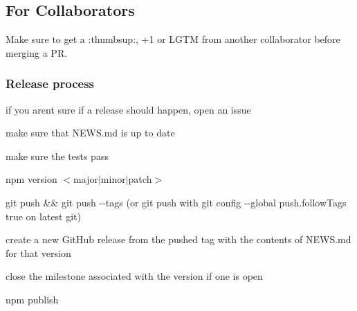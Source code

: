 \subsection*{For Collaborators}

Make sure to get a {\ttfamily \+:thumbsup\+:}, {\ttfamily +1} or {\ttfamily L\+G\+TM} from another collaborator before merging a PR.

\subsubsection*{Release process}


\begin{DoxyItemize}
\item if you aren\textquotesingle{}t sure if a release should happen, open an issue
\item make sure that {\ttfamily N\+E\+W\+S.\+md} is up to date
\item make sure the tests pass
\item {\ttfamily npm version $<$major$\vert$minor$\vert$patch$>$}
\item {\ttfamily git push \&\& git push -\/-\/tags} (or {\ttfamily git push} with {\ttfamily git config -\/-\/global push.\+follow\+Tags true} on latest git)
\item create a new Git\+Hub release from the pushed tag with the contents of {\ttfamily N\+E\+W\+S.\+md} for that version
\item close the milestone associated with the version if one is open
\item {\ttfamily npm publish} 
\end{DoxyItemize}